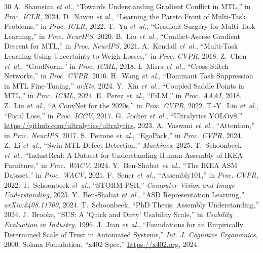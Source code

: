 \documentclass[conference]{IEEEtran}
\begin{document}
\balance
\begin{thebibliography}{30}
 A.~Shamsian \emph{et al.}, ``Towards Understanding Gradient Conflict in MTL,'' in \emph{Proc. ICLR}, 2024.
 D.~Navon \emph{et al.}, ``Learning the Pareto Front of Multi-Task Problems,'' in \emph{Proc. ICLR}, 2022.
 T.~Yu \emph{et~al.}, ``Gradient Surgery for Multi-Task Learning,'' in \emph{Proc. NeurIPS}, 2020.
 B.~Liu \emph{et~al.}, ``Conflict-Averse Gradient Descent for MTL,'' in \emph{Proc. NeurIPS}, 2021.
 A.~Kendall \emph{et~al.}, ``Multi-Task Learning Using Uncertainty to Weigh Losses,'' in \emph{Proc. CVPR}, 2018.
 Z.~Chen \emph{et~al.}, ``GradNorm,'' in \emph{Proc. ICML}, 2018.
 I.~Misra \emph{et~al.}, ``Cross-Stitch Networks,'' in \emph{Proc. CVPR}, 2016.
 H.~Wang \emph{et~al.}, ``Dominant Task Suppression in MTL Fine-Tuning,'' \emph{arXiv}, 2024.
 Y.~Xin \emph{et~al.}, ``Coupled Saddle Points in MTL,'' in \emph{Proc. ICML}, 2024.
 E.~Perez \emph{et~al.}, ``FiLM,'' in \emph{Proc. AAAI}, 2018.
 Z.~Liu \emph{et~al.}, ``A ConvNet for the 2020s,'' in \emph{Proc. CVPR}, 2022.
 T.-Y.~Lin \emph{et~al.}, ``Focal Loss,'' in \emph{Proc. ICCV}, 2017.
 G.~Jocher \emph{et~al.}, ``Ultralytics YOLOv8,'' \url{https://github.com/ultralytics/ultralytics}, 2023.
 A.~Vaswani \emph{et~al.}, ``Attention,'' in \emph{Proc. NeurIPS}, 2017.
 S.~Peirone \emph{et~al.}, ``EgoPack,'' in \emph{Proc. CVPR}, 2024.
 Z.~Li \emph{et~al.}, ``Swin MTL Defect Detection,'' \emph{Machines}, 2025.
 T.~Schoonbeek \emph{et~al.}, ``IndustReal: A Dataset for Understanding Human-Assembly of IKEA Furniture,'' in \emph{Proc. WACV}, 2024.
 Y.~Ben-Shabat \emph{et~al.}, ``The IKEA ASM Dataset,'' in \emph{Proc. WACV}, 2021.
 F.~Sener \emph{et~al.}, ``Assembly101,'' in \emph{Proc. CVPR}, 2022.
 T.~Schoonbeek \emph{et~al.}, ``STORM-PSR,'' \emph{Computer Vision and Image Understanding}, 2025.
 Y.~Ben-Shabat \emph{et~al.}, ``ASD Representation Learning,'' \emph{arXiv:2408.11700}, 2024.
 T.~Schoonbeek, ``PhD Thesis: Assembly Understanding,'' 2024.
 J.~Brooke, ``SUS: A 'Quick and Dirty' Usability Scale,'' in \emph{Usability Evaluation in Industry}, 1996.
 J.~Jian \emph{et~al.}, ``Foundations for an Empirically Determined Scale of Trust in Automated Systems,'' \emph{Int. J. Cognitive Ergonomics}, 2000.
 Solana Foundation, ``x402 Spec,'' \url{https://x402.org}, 2024.
\end{thebibliography}
\end{document}
